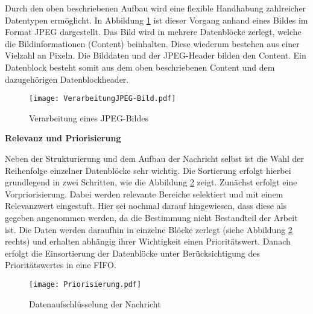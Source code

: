 Durch den oben beschriebenen Aufbau wird eine flexible Handhabung
zahlreicher Datentypen ermöglicht. In Abbildung \ref{fig:beispielJPG} ist
dieser Vorgang anhand eines Bildes im Format JPEG dargestellt. Das Bild wird in
mehrere Datenblöcke zerlegt, welche die Bildinformationen (Content) beinhalten.
Diese wiederum bestehen aus einer Vielzahl an Pixeln.
Die Bilddaten und der JPEG-Header bilden den Content. Ein Datenblock besteht
somit aus dem oben beschriebenen Content und dem dazugehörigen
Datenblockheader.

\begin{figure}[H]
	\centering
	\texttt{[image: VerarbeitungJPEG-Bild.pdf]}
	\caption{Verarbeitung eines JPEG-Bildes}
	\label{fig:beispielJPG}
\end{figure}

\textbf{Relevanz und Priorisierung}

Neben der Strukturierung und dem Aufbau der Nachricht selbst ist die
Wahl der Reihenfolge einzelner Datenblöcke sehr wichtig. Die Sortierung erfolgt
hierbei grundlegend in zwei Schritten, wie die Abbildung \ref{fig:priorisierungen}
zeigt. Zunächst erfolgt eine Vorpriorisierung. Dabei werden relevante Bereiche
selektiert und mit einem Relevanzwert eingestuft. Hier sei nochmal darauf
hingewiesen, dass diese als gegeben angenommen werden, da die Bestimmung nicht
Bestandteil der Arbeit ist. Die Daten werden daraufhin in einzelne Blöcke
zerlegt (siehe Abbildung \ref{fig:priorisierungen} rechts) und erhalten abhängig
ihrer Wichtigkeit einen Prioritätswert. Danach erfolgt die Einsortierung der
Datenblöcke unter Berücksichtigung des Prioritätswertes in eine \gls{FIFO}.

\begin{figure}[H]
	\centering
	\texttt{[image: Priorisierung.pdf]}
	\caption{Datenaufschlüsselung der Nachricht}
	\label{fig:priorisierungen}
\end{figure}
